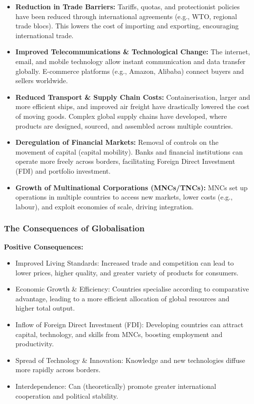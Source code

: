 \documentclass[11pt, a4paper, twoside]{book}
\begin{document}
\begin{itemize}
  \item \textbf{Reduction in Trade Barriers:} Tariffs, quotas, and protectionist policies have been reduced through international agreements (e.g., WTO, regional trade blocs). This lowers the cost of importing and exporting, encouraging international trade.
  \item \textbf{Improved Telecommunications \& Technological Change:} The internet, email, and mobile technology allow instant communication and data transfer globally. E-commerce platforms (e.g., Amazon, Alibaba) connect buyers and sellers worldwide.
  \item \textbf{Reduced Transport \& Supply Chain Costs:} Containerisation, larger and more efficient ships, and improved air freight have drastically lowered the cost of moving goods. Complex global supply chains have developed, where products are designed, sourced, and assembled across multiple countries.
  \item \textbf{Deregulation of Financial Markets:} Removal of controls on the movement of capital (capital mobility). Banks and financial institutions can operate more freely across borders, facilitating Foreign Direct Investment (FDI) and portfolio investment.
  \item \textbf{Growth of Multinational Corporations (MNCs/TNCs):} MNCs set up operations in multiple countries to access new markets, lower costs (e.g., labour), and exploit economies of scale, driving integration.
\end{itemize}

\subsubsection{The Consequences of Globalisation}

\textbf{Positive Consequences:}
\begin{itemize}
  \item Improved Living Standards: Increased trade and competition can lead to lower prices, higher quality, and greater variety of products for consumers.
  \item Economic Growth \& Efficiency: Countries specialise according to comparative advantage, leading to a more efficient allocation of global resources and higher total output.
  \item Inflow of Foreign Direct Investment (FDI): Developing countries can attract capital, technology, and skills from MNCs, boosting employment and productivity.
  \item Spread of Technology \& Innovation: Knowledge and new technologies diffuse more rapidly across borders.
  \item Interdependence: Can (theoretically) promote greater international cooperation and political stability.
\end{itemize}
\end{document}
